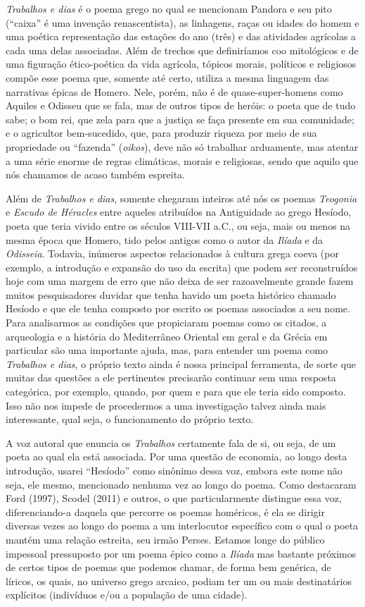 \emph{Trabalhos e dias} é o poema grego no qual se mencionam Pandora e
seu pito (``caixa'' é uma invenção renascentista), as linhagens, raças
ou idades do homem e uma poética representação das estações do ano
(três) e das atividades agrícolas a cada uma delas associadas. Além de
trechos que definiríamos coo mitológicos e de uma figuração
ético-poética da vida agrícola, tópicos morais, políticos e religiosos
compõe esse poema que, somente até certo, utiliza a mesma linguagem das
narrativas épicas de Homero. Nele, porém, não é de quase-super-homens
como Aquiles e Odisseu que se fala, mas de outros tipos de heróis: o
poeta que de tudo sabe; o bom rei, que zela para que a justiça se faça
presente em sua comunidade; e o agricultor bem-sucedido, que, para
produzir riqueza por meio de sua propriedade ou ``fazenda''
(\emph{oikos}), deve não só trabalhar arduamente, mas atentar a uma
série enorme de regras climáticas, morais e religiosas, sendo que aquilo
que nós chamamos de acaso também espreita.

Além de \emph{Trabalhos e dias}, somente chegaram inteiros até nós os
poemas \emph{Teogonia} e \emph{Escudo de Héracles} entre aqueles
atribuídos na Antiguidade ao grego Hesíodo, poeta que teria vivido entre
os séculos VIII-VII a.C., ou seja, mais ou menos na mesma época que
Homero, tido pelos antigos como o autor da \emph{Ilíada} e da
\emph{Odisseia}. Todavia, inúmeros aspectos relacionados à cultura grega
coeva (por exemplo, a introdução e expansão do uso da escrita) que podem
ser reconstruídos hoje com uma margem de erro que não deixa de ser
razoavelmente grande fazem muitos pesquisadores duvidar que tenha havido
um poeta histórico chamado Hesíodo e que ele tenha composto por escrito
os poemas associados a seu nome. Para analisarmos as condições que
propiciaram poemas como os citados, a arqueologia e a história do
Mediterrâneo Oriental em geral e da Grécia em particular são uma
importante ajuda, mas, para entender um poema como \emph{Trabalhos e
dias}, o próprio texto ainda é nossa principal ferramenta, de sorte que
muitas das questões a ele pertinentes precisarão continuar sem uma
resposta categórica, por exemplo, quando, por quem e para que ele teria
sido composto. Isso não nos impede de procedermos a uma investigação
talvez ainda mais interessante, qual seja, o funcionamento do próprio
texto.

A voz autoral que enuncia os \emph{Trabalhos} certamente fala de si, ou
seja, de um poeta ao qual ela está associada. Por uma questão de
economia, ao longo desta introdução, usarei ``Hesíodo'' como sinônimo
dessa voz, embora este nome não seja, ele mesmo, mencionado nenhuma vez
ao longo do poema. Como destacaram Ford (1997), Scodel (2011) e outros,
o que particularmente distingue essa voz, diferenciando-a daquela que
percorre os poemas homéricos, é ela se dirigir diversas vezes ao longo
do poema a um interlocutor específico com o qual o poeta mantém uma
relação estreita, seu irmão Perses. Estamos longe do público impessoal
pressuposto por um poema épico como a \emph{Ilíada} mas bastante
próximos de certos tipos de poemas que podemos chamar, de forma bem
genérica, de líricos, os quais, no universo grego arcaico, podiam ter um
ou mais destinatários explícitos (indivíduos e/ou a população de uma
cidade).


